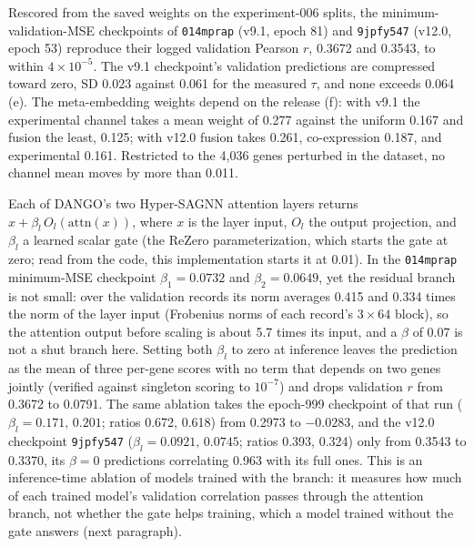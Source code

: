  Rescored from the saved weights on the
experiment-006 splits, the minimum-validation-MSE checkpoints of \texttt{014mprap} (v9.1,
epoch 81) and \texttt{9jpfy547} (v12.0, epoch 53) reproduce their logged validation Pearson
$r$, 0.3672 and 0.3543, to within $4\times10^{-5}$. The v9.1 checkpoint's validation
predictions are compressed toward zero, SD 0.023 against 0.061 for the measured $\tau$, and none
exceeds 0.064 (e). The meta-embedding weights depend on the release
(f): with v9.1 the experimental channel takes a mean weight of 0.277
against the uniform 0.167 and fusion the least, 0.125; with v12.0 fusion takes 0.261,
co-expression 0.187, and experimental 0.161. Restricted to the 4,036 genes perturbed in the
dataset, no channel mean moves by more than 0.011.

 Each of DANGO's two Hyper-SAGNN attention layers returns
$x+\beta_l\,O_l(\mathrm{attn}(x))$, where $x$ is the layer input, $O_l$ the output projection,
and $\beta_l$ a learned scalar gate (the ReZero parameterization, which starts the gate at zero;
read from the code, this implementation starts it at 0.01). In the
\texttt{014mprap} minimum-MSE checkpoint $\beta_1=0.0732$ and $\beta_2=0.0649$, yet the
residual branch is not small: over the validation records its norm averages 0.415 and 0.334
times the norm of the layer input (Frobenius norms of each record's $3\times64$ block), so the
attention output before scaling is about 5.7 times its input, and a $\beta$ of 0.07 is not a
shut branch here. Setting both $\beta_l$ to zero at inference leaves the prediction as the mean
of three per-gene scores with no term that depends on two genes jointly (verified against
singleton scoring to $10^{-7}$) and drops validation $r$ from 0.3672 to 0.0791. The same
ablation takes the epoch-999 checkpoint of that run ($\beta_l=0.171,\,0.201$; ratios 0.672,
0.618) from 0.2973 to $-0.0283$, and the v12.0 checkpoint \texttt{9jpfy547} ($\beta_l=0.0921,
\,0.0745$; ratios 0.393, 0.324) only from 0.3543 to 0.3370, its $\beta=0$ predictions
correlating 0.963 with its full ones. This is an inference-time ablation of models trained
with the branch: it measures how much of each trained model's validation correlation passes
through the attention branch, not whether the gate helps training, which a model trained
without the gate answers (next paragraph).

